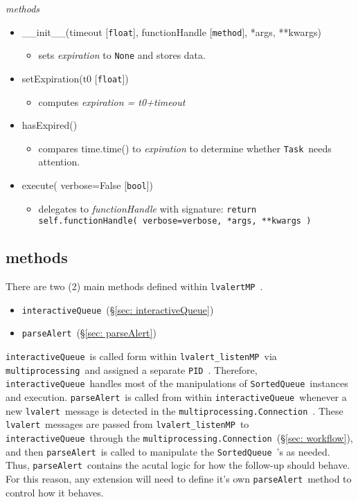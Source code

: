 \documentclass{article}
\newcommand{\PID}{\texttt{PID}~}
\newcommand{\multiprocessing}{\texttt{multiprocessing}~}
\newcommand{\multiprocessingConnection}{\texttt{multiprocessing.Connection}~}
\newcommand{\alert}{\texttt{lvalert}~}
\newcommand{\lvalertMP}{\texttt{lvalertMP}~}
\newcommand{\lvalertListenMP}{\texttt{lvalert\_listenMP}~}
\newcommand{\interactiveQueue}{\texttt{interactiveQueue}~}
\newcommand{\parseAlert}{\texttt{parseAlert}~}
\newcommand{\SortedQueue}{\texttt{SortedQueue}~}
\newcommand{\Task}{\texttt{Task}~}
\begin{document}
\noindent
\textit{methods}

\begin{itemize}
    \item{\_\_init\_\_(timeout [\texttt{float}], functionHandle [\texttt{method}], *args, **kwargs)
        \begin{itemize}
            \item{sets \textit{expiration} to \texttt{None} and stores data.}
        \end{itemize}
         }
    \item{setExpiration(t0 [\texttt{float}])
        \begin{itemize}
            \item{computes \textit{expiration = t0+timeout}}
        \end{itemize}
         }
    \item{hasExpired()
        \begin{itemize}
            \item{compares time.time() to \textit{expiration} to determine whether \Task needs attention.}
        \end{itemize}
         }
    \item{execute( verbose=False [\texttt{bool}])
        \begin{itemize}
            \item{delegates to \textit{functionHandle} with signature: \texttt{return self.functionHandle( verbose=verbose, *args, **kwargs )}}
        \end{itemize}
         }
\end{itemize}


\subsection{methods}
\label{sec: methods}

There are two (2) main methods defined within \lvalertMP. 
\begin{itemize}
    \item{\interactiveQueue (\S\ref{sec: interactiveQueue})}
    \item{\parseAlert (\S\ref{sec: parseAlert})}
\end{itemize}
\interactiveQueue is called form within \lvalertListenMP via \multiprocessing and assigned a separate \PID.
Therefore, \interactiveQueue handles most of the manipulations of \SortedQueue instances and execution.
\parseAlert is called from within \interactiveQueue whenever a new \alert message is detected in the \multiprocessingConnection.
These \alert messages are passed from \lvalertListenMP to \interactiveQueue through the \multiprocessingConnection (\S\ref{sec: workflow}), and then \parseAlert is called to manipulate the \SortedQueue's as needed.
Thus, \parseAlert contains the acutal logic for how the follow-up should behave.
For this reason, any extension will need to define it's own \parseAlert method to control how it behaves.
\end{document}
